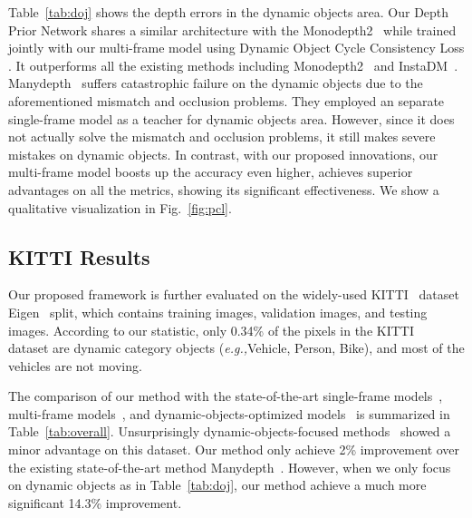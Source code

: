 \documentclass[runningheads]{llncs}
\newcommand{\eg}{\textit{e.g.,}}
\begin{document}
Table~\ref{tab:doj} shows the depth errors in the dynamic objects area. Our Depth Prior Network  shares a similar architecture with the Monodepth2~\cite{monodepth2} while trained jointly with our multi-frame model  using Dynamic Object Cycle Consistency Loss . It outperforms all the existing methods including Monodepth2~\cite{monodepth2} and InstaDM~\cite{instadm}. Manydepth~\cite{manydepth} suffers catastrophic failure on the dynamic objects due to the aforementioned mismatch and occlusion problems. They employed an separate single-frame model as a teacher for dynamic objects area. However, since it does not actually solve the mismatch and occlusion problems, it still makes severe mistakes on dynamic objects. In contrast, with our proposed innovations, our multi-frame model  boosts up the accuracy even higher, achieves superior advantages on all the metrics, showing its significant effectiveness. We show a qualitative visualization in Fig.~\ref{fig:pcl}.



\subsection{KITTI Results}
Our proposed framework is further evaluated on the widely-used KITTI~\cite{kitti} dataset Eigen~\cite{eigen-split} split, which contains  training images,  validation images, and  testing images. According to our statistic, only 0.34\% of the pixels in the KITTI~\cite{kitti} dataset are dynamic category objects (\eg Vehicle, Person, Bike), and most of the vehicles are not moving. 

The comparison of our method with the state-of-the-art single-frame models~\cite{monodepth2,casser2018depth,li2020unsupervised,packnet}, multi-frame models~\cite{patil2020dont,wang2020self,manydepth}, and dynamic-objects-optimized models~\cite{instadm,lee2021attentive} is summarized in Table~\ref{tab:overall}. Unsurprisingly dynamic-objects-focused methods~\cite{casser2018depth,instadm,lee2021attentive,gao2020attentional,gordon2019depth,li2020unsupervised} showed a minor advantage on this dataset. Our method only achieve 2\% improvement over the existing state-of-the-art method Manydepth~\cite{manydepth}. However, when we only focus on dynamic objects as in Table~\ref{tab:doj}, our method achieve a much more significant 14.3\% improvement.
\end{document}
